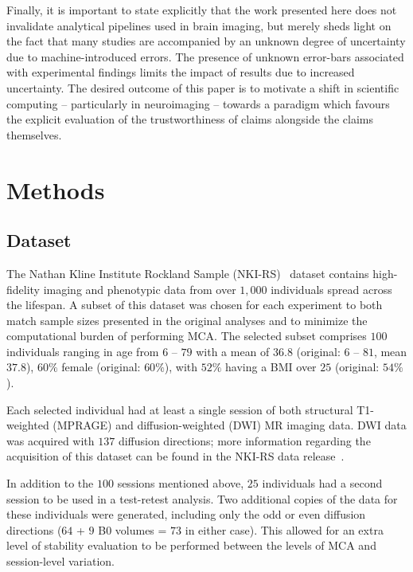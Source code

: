 \documentclass[fleqn,10pt]{SelfArx} %
\begin{document}
Finally, it is important to state explicitly that the work presented here does not invalidate analytical pipelines used
in brain imaging, but merely sheds light on the fact that many studies are accompanied by an unknown degree of
uncertainty due to machine-introduced errors. The presence of unknown error-bars associated with experimental findings
limits the impact of results due to increased uncertainty. The desired outcome of this paper is to motivate a shift in
scientific computing – particularly in neuroimaging – towards a paradigm which favours the explicit evaluation of the
trustworthiness of claims alongside the claims themselves.
 

\clearpage

\section*{Methods}

\subsection*{Dataset}
The Nathan Kline Institute Rockland Sample (NKI-RS)~\cite{Nooner2012-eg} dataset contains high-fidelity imaging and
phenotypic data from over $1,000$ individuals spread across the lifespan. A subset of this dataset was chosen for each
experiment to both match sample sizes presented in the original analyses and to minimize the computational burden of
performing MCA. The selected subset comprises $100$ individuals ranging in age from $6$ – $79$ with a mean of $36.8$
(original: $6$ – $81$, mean $37.8$), $60\%$ female (original: $60\%$), with $52\%$ having a BMI over $25$ (original:
$54\%$).

Each selected individual had at least a single session of both structural T1-weighted (MPRAGE) and diffusion-weighted
(DWI) MR imaging data. DWI data was acquired with $137$ diffusion directions; more information regarding the
acquisition of this dataset can be found in the NKI-RS data release~\cite{Nooner2012-eg}.

In addition to the $100$ sessions mentioned above, $25$ individuals had a second session to be used in a test-retest
analysis. Two additional copies of the data for these individuals were generated, including only the odd or even
diffusion directions ($64$ + $9$ B0 volumes = $73$ in either case). This allowed for an extra level of stability
evaluation to be performed between the levels of MCA and session-level variation.
\end{document}
